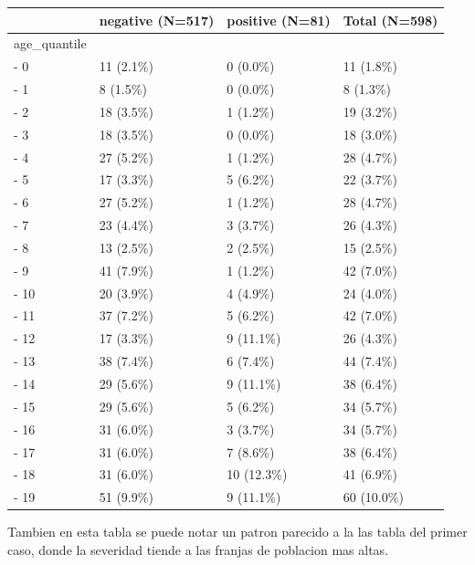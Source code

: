 \documentclass[
]{article}
\begin{document}
\begin{longtable}[]{@{}llll@{}}
\toprule()
& negative (N=517) & positive (N=81) & Total (N=598) \\
\midrule()
\endhead
age\_quantile & & & \\
- 0 & 11 (2.1\%) & 0 (0.0\%) & 11 (1.8\%) \\
- 1 & 8 (1.5\%) & 0 (0.0\%) & 8 (1.3\%) \\
- 2 & 18 (3.5\%) & 1 (1.2\%) & 19 (3.2\%) \\
- 3 & 18 (3.5\%) & 0 (0.0\%) & 18 (3.0\%) \\
- 4 & 27 (5.2\%) & 1 (1.2\%) & 28 (4.7\%) \\
- 5 & 17 (3.3\%) & 5 (6.2\%) & 22 (3.7\%) \\
- 6 & 27 (5.2\%) & 1 (1.2\%) & 28 (4.7\%) \\
- 7 & 23 (4.4\%) & 3 (3.7\%) & 26 (4.3\%) \\
- 8 & 13 (2.5\%) & 2 (2.5\%) & 15 (2.5\%) \\
- 9 & 41 (7.9\%) & 1 (1.2\%) & 42 (7.0\%) \\
- 10 & 20 (3.9\%) & 4 (4.9\%) & 24 (4.0\%) \\
- 11 & 37 (7.2\%) & 5 (6.2\%) & 42 (7.0\%) \\
- 12 & 17 (3.3\%) & 9 (11.1\%) & 26 (4.3\%) \\
- 13 & 38 (7.4\%) & 6 (7.4\%) & 44 (7.4\%) \\
- 14 & 29 (5.6\%) & 9 (11.1\%) & 38 (6.4\%) \\
- 15 & 29 (5.6\%) & 5 (6.2\%) & 34 (5.7\%) \\
- 16 & 31 (6.0\%) & 3 (3.7\%) & 34 (5.7\%) \\
- 17 & 31 (6.0\%) & 7 (8.6\%) & 38 (6.4\%) \\
- 18 & 31 (6.0\%) & 10 (12.3\%) & 41 (6.9\%) \\
- 19 & 51 (9.9\%) & 9 (11.1\%) & 60 (10.0\%) \\
\bottomrule()
\end{longtable}

Tambien en esta tabla se puede notar un patron parecido a la las tabla
del primer caso, donde la severidad tiende a las franjas de poblacion
mas altas.
\end{document}
